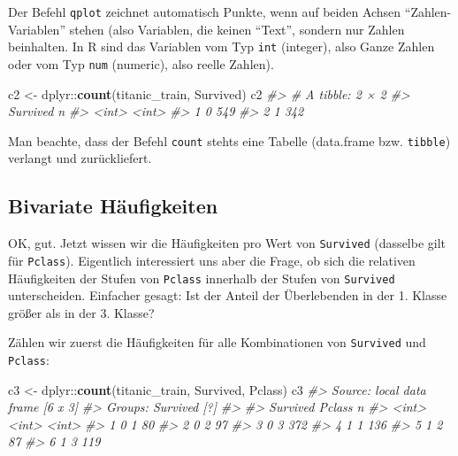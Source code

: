 \documentclass[12pt,]{book}
\makeatletter
\newenvironment{Shaded}{\begin{snugshade}}{\end{snugshade}}
\newcommand{\KeywordTok}[1]{\textcolor[rgb]{0.13,0.29,0.53}{\textbf{{#1}}}}
\newcommand{\StringTok}[1]{\textcolor[rgb]{0.31,0.60,0.02}{{#1}}}
\newcommand{\CommentTok}[1]{\textcolor[rgb]{0.56,0.35,0.01}{\textit{{#1}}}}
\newcommand{\NormalTok}[1]{{#1}}
\newenvironment{kframe}{%
\medskip{}
\setlength{\fboxsep}{.8em}
 \def\at@end@of@kframe{}%
 \ifinner\ifhmode%
  \def\at@end@of@kframe{\end{minipage}}%
  \begin{minipage}{\columnwidth}%
 \fi\fi%
 \def\FrameCommand##1{\hskip\@totalleftmargin \hskip-\fboxsep
 \colorbox{shadecolor}{##1}\hskip-\fboxsep
     \hskip-\linewidth \hskip-\@totalleftmargin \hskip\columnwidth}%
 \MakeFramed {\advance\hsize-\width
   \@totalleftmargin\z@ \linewidth\hsize
   \@setminipage}}%
 {\par\unskip\endMakeFramed%
 \at@end@of@kframe}
\renewenvironment{Shaded}{\begin{kframe}}{\end{kframe}}
\makeatother
\begin{document}
Der Befehl \texttt{qplot} zeichnet automatisch Punkte, wenn auf beiden
Achsen ``Zahlen-Variablen'' stehen (also Variablen, die keinen ``Text'',
sondern nur Zahlen beinhalten. In R sind das Variablen vom Typ
\texttt{int} (integer), also Ganze Zahlen oder vom Typ \texttt{num}
(numeric), also reelle Zahlen).

\begin{Shaded}
\begin{Highlighting}[]

\NormalTok{c2 <-}\StringTok{ }\NormalTok{dplyr::}\KeywordTok{count}\NormalTok{(titanic_train, Survived)}
\NormalTok{c2}
\CommentTok{#> # A tibble: 2 × 2}
\CommentTok{#>   Survived     n}
\CommentTok{#>      <int> <int>}
\CommentTok{#> 1        0   549}
\CommentTok{#> 2        1   342}
\end{Highlighting}
\end{Shaded}

Man beachte, dass der Befehl \texttt{count} stehts eine Tabelle
(data.frame bzw. \texttt{tibble}) verlangt und zurückliefert.

\subsection{Bivariate Häufigkeiten}\label{bivariate-haufigkeiten}

OK, gut. Jetzt wissen wir die Häufigkeiten pro Wert von
\texttt{Survived} (dasselbe gilt für \texttt{Pclass}). Eigentlich
interessiert uns aber die Frage, ob sich die relativen Häufigkeiten der
Stufen von \texttt{Pclass} innerhalb der Stufen von \texttt{Survived}
unterscheiden. Einfacher gesagt: Ist der Anteil der Überlebenden in der
1. Klasse größer als in der 3. Klasse?

Zählen wir zuerst die Häufigkeiten für alle Kombinationen von
\texttt{Survived} und \texttt{Pclass}:

\begin{Shaded}
\begin{Highlighting}[]
\NormalTok{c3 <-}\StringTok{ }\NormalTok{dplyr::}\KeywordTok{count}\NormalTok{(titanic_train, Survived, Pclass)}
\NormalTok{c3}
\CommentTok{#> Source: local data frame [6 x 3]}
\CommentTok{#> Groups: Survived [?]}
\CommentTok{#> }
\CommentTok{#>   Survived Pclass     n}
\CommentTok{#>      <int>  <int> <int>}
\CommentTok{#> 1        0      1    80}
\CommentTok{#> 2        0      2    97}
\CommentTok{#> 3        0      3   372}
\CommentTok{#> 4        1      1   136}
\CommentTok{#> 5        1      2    87}
\CommentTok{#> 6        1      3   119}
\end{Highlighting}
\end{Shaded}
\end{document}
